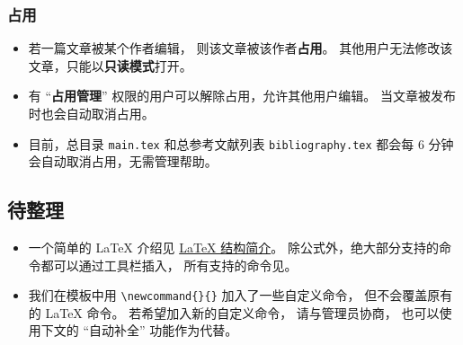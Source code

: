 \subsubsection{占用}
\begin{itemize}
\item 若一篇文章被某个作者编辑， 则该文章被该作者\textbf{占用}。 其他用户无法修改该文章，只能以\textbf{只读模式}打开。
\item 有 “\textbf{占用管理}” 权限的用户可以解除占用，允许其他用户编辑。 当文章被发布时也会自动取消占用。
\item 目前，总目录 \verb`main.tex` 和总参考文献列表 \verb`bibliography.tex` 都会每 6 分钟会自动取消占用，无需管理帮助。
\end{itemize}


\subsection{待整理}

\begin{itemize}
\item 一个简单的 LaTeX 介绍见 \href{https://wuli.wiki/online/latxIn.html}{LaTeX 结构简介}。 除公式外，绝大部分支持的命令都可以通过工具栏插入， 所有支持的命令见。
\item 我们在模板中用 \verb|\newcommand{}{}| 加入了一些自定义命令， 但不会覆盖原有的 LaTeX 命令。 若希望加入新的自定义命令， 请与管理员协商， 也可以使用下文的 “自动补全” 功能作为代替。
\end{itemize}

